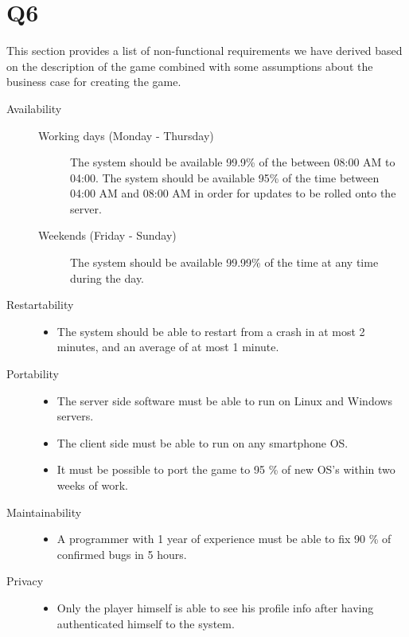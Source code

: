 \section{Q6}
This section provides a list of non-functional requirements we have derived based on the description of the game combined with some assumptions about the business case for creating the game.
\begin{description}

\item [Availability] \hfill 
	\begin{description}
		\item[Working days (Monday - Thursday)] The system should be available 99.9\% of the between 08:00 AM to 04:00. The system should be available 95\% of the time between 04:00 AM and 08:00 AM in order for updates to be rolled onto the server.
		\item[Weekends (Friday - Sunday)] The system should be available 99.99\% of the time at any time during the day. 
	\end{description}

\item [Restartability] \hfill 
	\begin{itemize}
	   \item The system should be able to restart from a crash in at most 2 minutes, and an average of at most 1 minute.
	\end{itemize}

\item [Portability] \hfill 
	\begin{itemize}
		\item The server side software must be able to run on Linux and Windows servers.
		\item The client side must be able to run on any smartphone OS.
		\item It must be possible to port the game to 95 \% of new OS's within two weeks of work.
	\end{itemize}

\item [Maintainability] \hfill 
	\begin{itemize}
	  	\item A programmer with 1 year of experience must be able to fix 90 \% of confirmed bugs in 5 hours.
	\end{itemize}



\item [Privacy] \hfill 
	\begin{itemize}
		\item Only the player himself is able to see his profile info after having authenticated himself to the system.
	\end{itemize}


\end{description}
